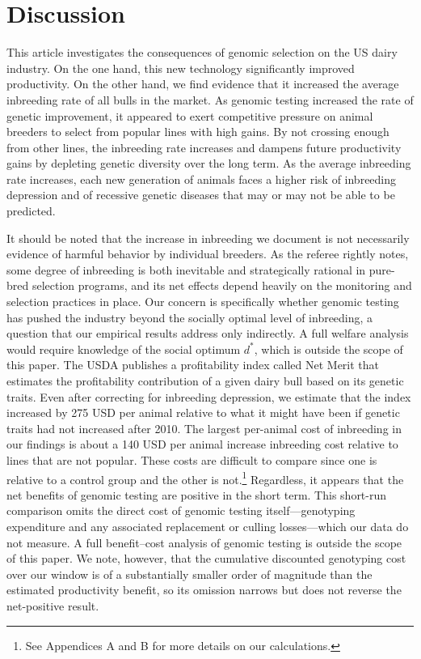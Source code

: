 \documentclass[12pt,letterpaper]{article}
\begin{document}
\section{Discussion\label{sec:discussion}}
This article investigates the consequences of genomic selection on the US dairy industry. On the one hand, this new technology significantly improved productivity. 
On the other hand, we find evidence that it increased the average inbreeding rate of all bulls in the market. As genomic testing increased the rate of genetic improvement, it appeared to exert competitive pressure on animal breeders to select from popular lines with high gains.
By not crossing enough from other lines, the inbreeding rate increases and dampens future productivity gains by depleting genetic diversity over the long term.
As the average inbreeding rate increases, each new generation of animals faces a higher risk of inbreeding depression and of recessive genetic diseases that may or may not be able to be predicted.

It should be noted that the increase in inbreeding we document is not necessarily evidence of harmful behavior by individual breeders. As the referee rightly notes, some degree of inbreeding is both inevitable and strategically rational in pure-bred selection programs, and its net effects depend heavily on the monitoring and selection practices in place. Our concern is specifically whether genomic testing has pushed the industry beyond the socially optimal level of inbreeding, a question that our empirical results address only indirectly. A full welfare analysis would require knowledge of the social optimum $d^{*}$, which is outside the scope of this paper.
The USDA publishes a profitability index called Net Merit that estimates the profitability contribution of a given dairy bull based on its genetic traits.
Even after correcting for inbreeding depression, we estimate that the index increased by 275 USD per animal relative to what it might have been if genetic traits had not increased after 2010.
The largest per-animal cost of inbreeding in our findings is about a 140 USD per animal increase inbreeding cost relative to lines that are not popular. These costs are difficult to compare since one is relative to a control group and the other is not.\footnote{See Appendices A and B for more details on our calculations.}
Regardless, it appears that the net benefits of genomic testing are positive in the short term.
This short-run comparison omits the direct cost of genomic testing itself---genotyping expenditure and any associated replacement or culling losses---which our data do not measure. A full benefit--cost analysis of genomic testing is outside the scope of this paper. We note, however, that the cumulative discounted genotyping cost over our window is of a substantially smaller order of magnitude than the estimated productivity benefit, so its omission narrows but does not reverse the net-positive result. %
\end{document}

